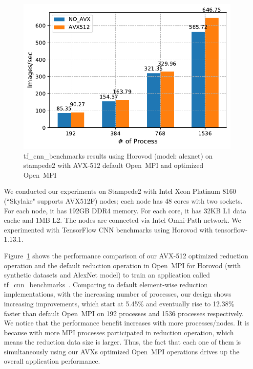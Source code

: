 \documentclass[5p,times,twocolumn]{elsarticle}
\newcommand{\ompi}[0]{Open~MPI\xspace}
\begin{document}
\begin{figure}[h]
    \centering
    \includegraphics[width=\linewidth]{horovod_tacc.pdf}
    \caption{tf\_cnn\_benchmarks results using Horovod (model: alexnet) on stampede2
    with AVX-512 default \ompi and optimized \ompi}
    \label{fig:horovodtacc}
\end{figure}

We conducted our experiments on Stampede2 with Intel Xeon Platinum 8160 (``Skylake" supports AVX512F) nodes; each node has 48 cores with two sockets. For each node, it has 192GB DDR4 memory. For each core, it has 32KB L1 data cache and 1MB L2. The nodes are connected via Intel Omni-Path network.
We experimented with TensorFlow CNN benchmarks using Horovod with tensorflow-1.13.1.

Figure~\ref{fig:horovodtacc} shows the performance comparison of
our AVX-512 optimized reduction operation and the default reduction operation in \ompi for Horovod (with synthetic datasets and AlexNet model) to train an application called tf\_cnn\_benchmarks~\cite{cnnTensorflow}.
Comparing to default element-wise reduction
implementations, with the increasing number of processes,
our design shows increasing improvements, which start at 5.45\% and
eventually rise to 12.38\% faster than default \ompi on 192 processes and 1536 processes respectively.
We notice that the performance benefit increases with more processes/nodes.
It is because with more MPI processes participated in reduction operation, which means the reduction data size is larger.
Thus, the fact that each one of them is simultaneously using our AVXs optimized \ompi
operations drives up the overall application performance.
\end{document}

